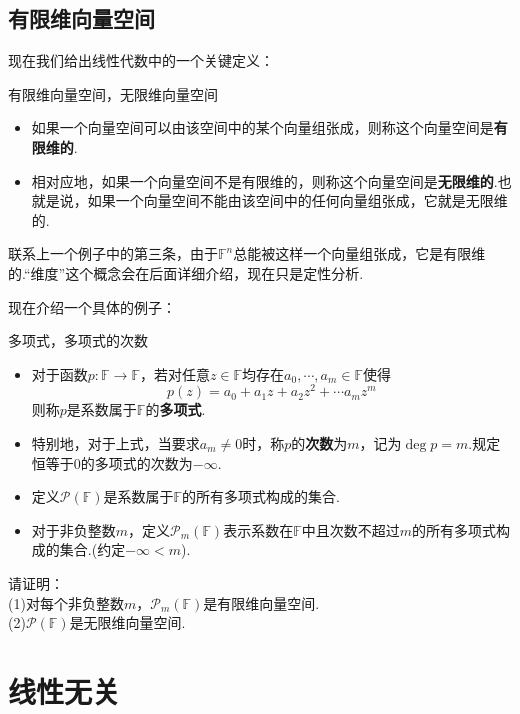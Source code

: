 \documentclass[lang=cn, zihao=5]{elegantbook}
\newcommand{\F}{\mathbb{F}}
\begin{document}
\subsection{有限维向量空间}

现在我们给出线性代数中的一个关键定义：

\begin{definition}{有限维向量空间，无限维向量空间}
	\begin{itemize}
		\item 如果一个向量空间可以由该空间中的某个向量组张成，则称这个向量空间是\textbf{有限维的}.
		\item 相对应地，如果一个向量空间不是有限维的，则称这个向量空间是\textbf{无限维的}.也就是说，如果一个向量空间不能由该空间中的任何向量组张成，它就是无限维的.
	\end{itemize}
\end{definition}

联系上一个例子中的第三条，由于$\F ^{n}$总能被这样一个向量组张成，它是有限维的.“维度”这个概念会在后面详细介绍，现在只是定性分析.

现在介绍一个具体的例子：

\begin{definition}{多项式，多项式的次数}
	\begin{itemize}
		\item 对于函数$p:\F \to \F$，若对任意$z \in \F$均存在$a_0, \cdots ,a_m \in \F$使得$$p(z) = a_0 + a_1z + a_2z^2 + \cdots a_mz^m$$
		则称$p$是系数属于$\F$的\textbf{多项式}.
		\item 特别地，对于上式，当要求$a_m \neq 0$时，称$p$的\textbf{次数}为$m$，记为$\deg p = m$.规定恒等于$0$的多项式的次数为$-\infty$.
		\item 定义$\mathcal{P} (\F)$是系数属于$\F$的所有多项式构成的集合.
		\item 对于非负整数$m$，定义$\mathcal{P}_{m} (\F)$表示系数在$\F$中且次数不超过$m$的所有多项式构成的集合.(约定$-\infty < m$).
	\end{itemize}
\end{definition}

\begin{example}
	请证明： \\
	(1)对每个非负整数$m$，$\mathcal{P} _{m} (\F)$是有限维向量空间. \\
	(2)$\mathcal{P} (\F)$是无限维向量空间.
\end{example}

\newpage
\section{线性无关}
\end{document}
